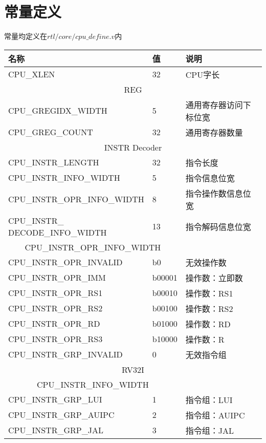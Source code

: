 \section{常量定义}
常量均定义在$rtl/core/cpu\_define.v$内\\
\begin{center}
\begin{tabular}{|l|p{3cm}|p{6cm}|}
    \hline
    名称    &   值  &   说明\\\hline
    CPU\_XLEN   &   32  &   CPU字长\\\hline
    \multicolumn{3}{|c|}{REG}\\\hline
    CPU\_GREGIDX\_WIDTH &   5   &   通用寄存器访问下标位宽\\\hline
    CPU\_GREG\_COUNT    &   32  &   通用寄存器数量\\\hline
    \multicolumn{3}{|c|}{INSTR Decoder}\\\hline
    CPU\_INSTR\_LENGTH & 32 & 指令长度\\\hline
    CPU\_INSTR\_INFO\_WIDTH & 5 & 指令信息位宽\\\hline
    CPU\_INSTR\_OPR\_INFO\_WIDTH & 8 & 指令操作数信息位宽\\\hline
    \makecell[{}{p{3cm}}]{CPU\_INSTR\_ \\ DECODE\_INFO\_WIDTH} & 13 & 指令解码信息位宽\\\hline
    \multicolumn{2}{|c|}{CPU\_INSTR\_OPR\_INFO\_WIDTH}&\\\hline
    CPU\_INSTR\_OPR\_INVALID & b0 & 无效操作数\\\hline
    CPU\_INSTR\_OPR\_IMM & b00001 & 操作数：立即数\\\hline
    CPU\_INSTR\_OPR\_RS1 & b00010 & 操作数：RS1\\\hline
    CPU\_INSTR\_OPR\_RS2 & b00100 & 操作数：RS2\\\hline
    CPU\_INSTR\_OPR\_RD & b01000 & 操作数：RD\\\hline
    CPU\_INSTR\_OPR\_RS3 & b10000 & 操作数：R\\\hline
    CPU\_INSTR\_GRP\_INVALID & 0 & 无效指令组\\\hline
    \multicolumn{3}{|c|}{RV32I}\\\hline
    \multicolumn{2}{|c|}{CPU\_INSTR\_INFO\_WIDTH}&\\\hline
    CPU\_INSTR\_GRP\_LUI & 1 & 指令组：LUI\\\hline
    CPU\_INSTR\_GRP\_AUIPC & 2 & 指令组：AUIPC\\\hline
    CPU\_INSTR\_GRP\_JAL & 3 & 指令组：JAL\\\hline

\end{tabular}
\end{center}
